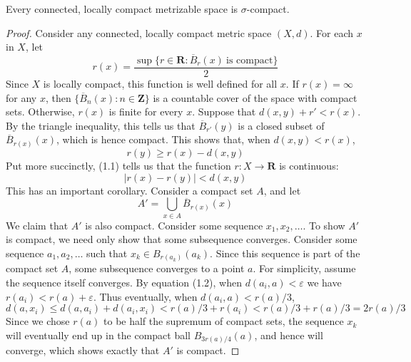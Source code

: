 \begin{lemma}[$3) \to (1$]
    Every connected, locally compact metrizable space is $\sigma$-compact.
\end{lemma}
\begin{proof}
    Consider any connected, locally compact metric space $(X,d)$. For each $x$ in $X$, let
    \[ r(x) = \frac{\sup \{ r \in \mathbf{R} : \overline{B}_r(x)\ \text{is compact} \}}{2} \]
    Since $X$ is locally compact, this function is well defined for all $x$. If $r(x) = \infty$ for any $x$, then $\{ \overline{B}_n(x) : n \in \mathbf{Z} \}$ is a countable cover of the space with compact sets. Otherwise, $r(x)$ is finite for every $x$. Suppose that $d(x,y) + r' < r(x)$. By the triangle inequality, this tells us that $\overline{B}_{r'}(y)$ is a closed subset of $\overline{B}_{r(x)}(x)$, which is hence compact. This shows that, when $d(x,y) < r(x)$,
    \begin{equation} r(y) \geq r(x) - d(x,y) \end{equation}
    Put more succinctly, (1.1) tells us that the function $r:X \to \mathbf{R}$ is continuous:
    \begin{equation} |r(x) - r(y)| < d(x,y) \end{equation}
    This has an important corollary. Consider a compact set $A$, and let
    \begin{equation} A' = \bigcup_{x \in A} \overline{B}_{r(x)}(x) \end{equation}
    We claim that $A'$ is also compact. Consider some sequence $x_1, x_2, \dots$. To show $A'$ is compact, we need only show that some subsequence converges. Consider some sequence $a_1, a_2, \dots$ such that $x_k \in B_{r(a_k)}(a_k)$. Since this sequence is part of the compact set $A$, some subsequence converges to a point $a$. For simplicity, assume the sequence itself converges. By equation (1.2), when $d(a_i, a) < \varepsilon$
    we have $r(a_i) < r(a) + \varepsilon$. Thus eventually, when $d(a_i,a) < r(a)/3$,
    \begin{equation} d(a,x_i) \leq d(a,a_i) + d(a_i,x_i) < r(a)/3 + r(a_i) < r(a)/3 + r(a)/3 = 2r(a)/3 \end{equation}
    Since we chose $r(a)$ to be half the supremum of compact sets, the sequence $x_k$ will eventually end up in the compact ball $B_{3r(a)/4}(a)$, and hence will converge, which shows exactly that $A'$ is compact.


\end{proof}
